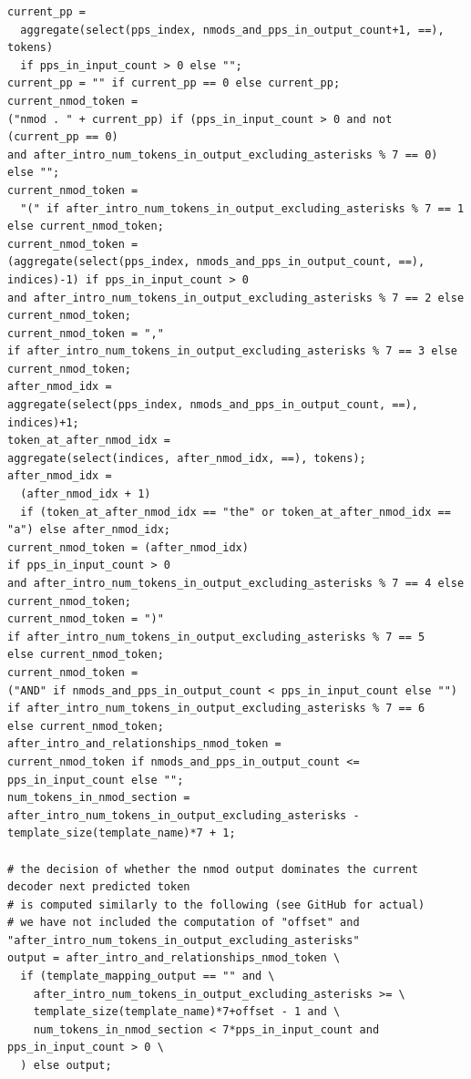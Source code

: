 \documentclass[11pt]{article}
\begin{document}
\begin{tiny}
\begin{verbatim}
current_pp = 
  aggregate(select(pps_index, nmods_and_pps_in_output_count+1, ==), tokens) 
  if pps_in_input_count > 0 else "";
current_pp = "" if current_pp == 0 else current_pp;
current_nmod_token = 
("nmod . " + current_pp) if (pps_in_input_count > 0 and not (current_pp == 0) 
and after_intro_num_tokens_in_output_excluding_asterisks % 7 == 0) else "";
current_nmod_token = 
  "(" if after_intro_num_tokens_in_output_excluding_asterisks % 7 == 1 else current_nmod_token;
current_nmod_token = 
(aggregate(select(pps_index, nmods_and_pps_in_output_count, ==), indices)-1) if pps_in_input_count > 0 
and after_intro_num_tokens_in_output_excluding_asterisks % 7 == 2 else current_nmod_token;
current_nmod_token = "," 
if after_intro_num_tokens_in_output_excluding_asterisks % 7 == 3 else current_nmod_token;
after_nmod_idx = 
aggregate(select(pps_index, nmods_and_pps_in_output_count, ==), indices)+1;
token_at_after_nmod_idx = 
aggregate(select(indices, after_nmod_idx, ==), tokens);
after_nmod_idx = 
  (after_nmod_idx + 1) 
  if (token_at_after_nmod_idx == "the" or token_at_after_nmod_idx == "a") else after_nmod_idx;
current_nmod_token = (after_nmod_idx) 
if pps_in_input_count > 0 
and after_intro_num_tokens_in_output_excluding_asterisks % 7 == 4 else current_nmod_token;
current_nmod_token = ")" 
if after_intro_num_tokens_in_output_excluding_asterisks % 7 == 5 
else current_nmod_token;
current_nmod_token = 
("AND" if nmods_and_pps_in_output_count < pps_in_input_count else "") 
if after_intro_num_tokens_in_output_excluding_asterisks % 7 == 6 
else current_nmod_token;
after_intro_and_relationships_nmod_token = 
current_nmod_token if nmods_and_pps_in_output_count <= pps_in_input_count else "";
num_tokens_in_nmod_section = 
after_intro_num_tokens_in_output_excluding_asterisks - template_size(template_name)*7 + 1;

# the decision of whether the nmod output dominates the current decoder next predicted token
# is computed similarly to the following (see GitHub for actual)
# we have not included the computation of "offset" and "after_intro_num_tokens_in_output_excluding_asterisks"
output = after_intro_and_relationships_nmod_token \
  if (template_mapping_output == "" and \
    after_intro_num_tokens_in_output_excluding_asterisks >= \
    template_size(template_name)*7+offset - 1 and \
    num_tokens_in_nmod_section < 7*pps_in_input_count and pps_in_input_count > 0 \
  ) else output;

\end{verbatim}
\end{tiny}
\end{document}
